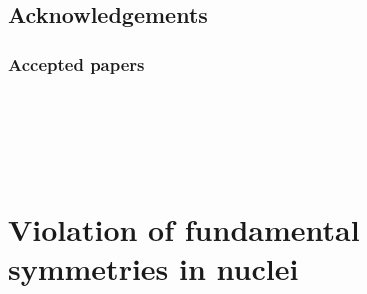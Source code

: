 \documentclass[10pt,a4paper, twoside]{report}
\begin{document}
\chapter*{Acknowledgements}
\thispagestyle{empty}

\clearpage
\section*{Accepted papers}
\cite{LDFDb2018}  \\
\cite{LFWQM2018}  \\
\cite{LDFOg2018}  \\
\cite{LFMQM2018}  \\
\cite{LDFSg2019} 
\part{Violation of  fundamental symmetries in nuclei}
\end{document}
